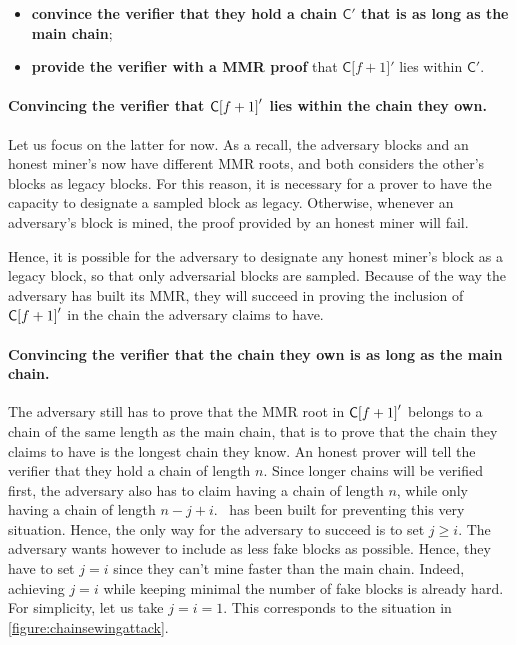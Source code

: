       \begin{itemize}
        \item \textbf{convince the verifier that they hold a chain \(\mathsf{C}'\) that is as long as the main chain};
        \item \textbf{provide the verifier with a MMR proof} that \(\mathsf{C[}f+1\mathsf{]}'\) lies within \(\mathsf{C}'\).
      \end{itemize}
      
      \paragraph{Convincing the verifier that \(\mathsf{C[}f+1\mathsf{]}'\) lies within the chain they own.} Let us focus on the latter for now. As a recall, the adversary blocks and an honest miner's now have different MMR roots, and both considers the other's blocks as legacy blocks. For this reason, it is necessary for a prover to have the capacity to designate a sampled block as legacy. Otherwise, whenever an adversary's block is mined, the proof provided by an honest miner will fail.
      
      Hence, it is possible for the adversary to designate any honest miner's block as a legacy block, so that only adversarial blocks are sampled. Because of the way the adversary has built its MMR, they will succeed in proving the inclusion of \(\mathsf{C[}f+1\mathsf{]}'\) in the chain the adversary claims to have.
      
      \paragraph{Convincing the verifier that the chain they own is as long as the main chain.} The adversary still has to prove that the MMR root in \(\mathsf{C[}f+1\mathsf{]}'\) belongs to a chain of the same length as the main chain, that is to prove that the chain they claims to have is the longest chain they know. An honest prover will tell the verifier that they hold a chain of length \(n\). Since longer chains will be verified first, the adversary also has to claim having a chain of length \(n\), while only having a chain of length \(n-j+i\). \FC\ has been built for preventing this very situation. Hence, the only way for the adversary to succeed is to set \(j\geqslant i\). The adversary wants however to include as less fake blocks as possible. Hence, they have to set \(j=i\) since they can't mine faster than the main chain. Indeed, achieving \(j=i\) while keeping minimal the number of fake blocks is already hard. For simplicity, let us take \(j=i=1\). This corresponds to the situation in \autoref{figure:chainsewingattack}.
      

